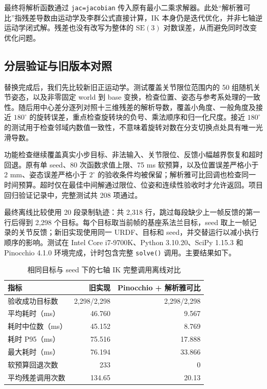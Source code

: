 \documentclass[UTF8,a4paper,zihao=-4]{ctexart}
\begin{document}
最终将解析函数通过 \texttt{jac=jacobian} 传入原有最小二乘求解器。此处“解析雅可比”指残差导数由运动学及李群公式直接计算，IK 本身仍是迭代优化，并非七轴逆运动学闭式解。残差也没有改写为整体的 $\mathrm{SE}(3)$ 对数误差，从而避免同时改变优化问题。

\subsection{分层验证与旧版本对照}

替换完成后，我们先比较新旧正运动学。测试覆盖关节限位范围内的 50 组随机关节姿态，以及非零固定 world 到 base 变换，检查位置、姿态与参考系处理的一致性。随后用中心差分逐列对照十三维残差的解析导数，覆盖小角度、一般角度及接近 $180^\circ$ 的旋转误差，重点检查旋转块的负号、乘法顺序和归一化尺度。接近 $180^\circ$ 的测试用于检查邻域内数值一致性，不意味着旋转对数在分支切换点处具有唯一光滑导数。

功能检查继续覆盖真实小步目标、非法输入、关节限位、反馈小幅越界恢复和超时回退。原有单 seed、80 次函数求值上限、75 ms 软预算，以及位置误差严格小于 2 mm、姿态误差严格小于 $2^\circ$ 的验收条件均被保留；解析雅可比回调也检查同一时间预算。超时仅在最佳中间解通过限位、位姿和连续性验收时才允许返回。项目回归验证记录中，完整测试共 208 项通过。

最终离线比较使用 20 段录制轨迹：共 2,318 行，跳过每段缺少上一帧反馈的第一行后得到 2,298 个目标。每个目标取当前帧的基座系法兰目标，seed 取上一帧记录的关节反馈；新旧实现使用同一 URDF、目标和 seed，并交替运行以减小执行顺序的影响。测试在 Intel Core i7-9700K、Python 3.10.20、SciPy 1.15.3 和 Pinocchio 4.1.0 环境完成，计时包含完整 \texttt{solve()} 调用。主要结果如下。

\begin{table}[H]
\centering
\small
\renewcommand{\arraystretch}{1.35}
\setlength{\tabcolsep}{5pt}
\begin{tabularx}{\textwidth}{@{}Yrr@{}}
\toprule
指标 & 旧实现 & Pinocchio + 解析雅可比\\
\midrule
验收成功目标数 & 2,298/2,298 & 2,298/2,298\\
平均耗时（ms） & 46.760 & 9.567\\
耗时中位数（ms） & 45.152 & 8.769\\
耗时 P95（ms） & 75.516 & 17.888\\
最大耗时（ms） & 76.194 & 33.866\\
软预算回退次数 & 233 & 0\\
平均残差调用次数 & 134.65 & 20.13\\
\bottomrule
\end{tabularx}
\caption{相同目标与 seed 下的七轴 IK 完整调用离线对比}
\end{table}
\end{document}
